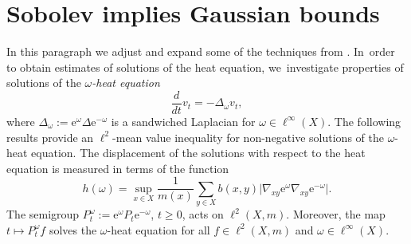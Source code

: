 \documentclass[10pt]{amsart}
\theoremstyle{plain}
\theoremstyle{definition}
\newcommand{\euler}{\mathrm{e}}
\begin{document}
\section{Sobolev implies Gaussian bounds}\label{section:SG}

In this paragraph we adjust and expand some of the techniques from \cite{KellerRose-22a}. In~order to obtain estimates of solutions of the heat equation, we~investigate properties of solutions of the \emph{$\omega$-heat equation}
\[
\frac{d}{dt} v_t= -\Delta_\omega v_t,
\]
where $\Delta_\omega:= \euler^\omega\Delta \euler^{-\omega}$ is a sandwiched Laplacian for $\omega\in\ell^\infty(X)$.
The following results provide an $\ell^2$-mean value inequality for non-negative solutions of the $\omega$-heat equation. The displacement of the solutions with respect to the heat equation is measured in terms of the function
\[
h(\omega)=\sup_{x\in X}\frac{1}{m(x)}\sum_{y\in X} b(x,y)\vert \nabla_{xy}\euler^\omega\nabla_{xy}\euler^{-\omega}\vert.
\]
The semigroup $P_t^\omega:=\euler^\omega P_t\euler^{-\omega}$, $ t\ge0 $, acts on $\ell^2(X,m)$. Moreover, the map $t\mapsto P_t^\omega f$ solves the $\omega$-heat equation for all $f\in\ell^2(X,m)$ and $\omega\in\ell^\infty(X)$.
\end{document}
